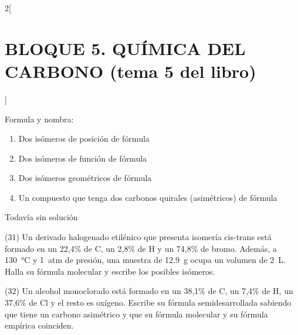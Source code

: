 \documentclass[10pt]{article}
\begin{document}
\begin{multicols}{2}[
  \section{BLOQUE 5. QUÍMICA DEL CARBONO (tema 5 del libro)}
  ]
\begin{exercise}[
    tags    = {},
    topics  = {química,química básica},
    source  = {FQ 1B MGH 2016, p85, e26},
  ]

  Formula y nombra:
  \begin{enumerate}
    \item Dos isómeros de posición de fórmula 
    \item Dos isómeros de función de fórmula 
    \item Dos isómeros geométricos de fórmula 
    \item Un compuesto que tenga dos carbonos quirales (asimétricos) de fórmula 
  \end{enumerate}
\end{exercise}

\begin{solution}[print=false]
  Todavía sin solución
\end{solution}




\begin{exercise}[
    tags    = {},
    topics  = {química,química básica},
    source  = {FQ 1B MGH 2016, p85, e26},
  ]

  (31) Un derivado halogenado etilénico que presenta isomería cis-trans
  está formado en un 22,4\% de C, un 2,8\% de H y un
  74,8\% de bromo. Además, a \SI{130}{\celsius} y \SI{1}{atm} de presión, una muestra de \SI{12,9}{\gram} ocupa un volumen de \SI{2}{\liter}. Halla su fórmula molecular y escribe los posibles isómeros.
\end{exercise}

\begin{solution}
\end{solution}




\begin{exercise}[
    tags    = {},
    topics  = {química,química básica},
    source  = {FQ 1B MGH 2016, p85, e26},
  ]

  (32) Un alcohol monoclorado está formado en un 38,1\% de C,
  un 7,4\% de H, un 37,6\% de Cl y el resto es oxígeno. Escribe
  su fórmula semidesarrollada sabiendo que tiene un carbono
  asimétrico y que su fórmula molecular y su fórmula empírica
  coinciden.
\end{exercise}

\begin{solution}
\end{solution}





\end{multicols}
\end{document}
